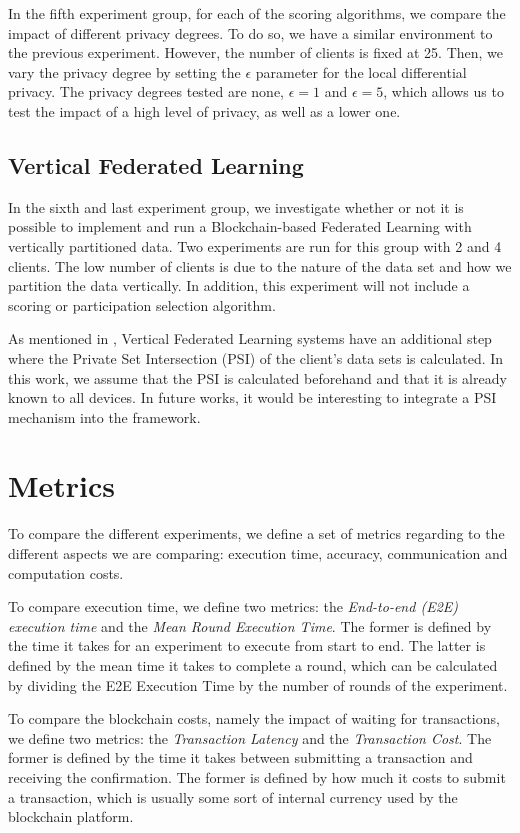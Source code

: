 In the fifth experiment group, for each of the scoring algorithms, we compare the impact of different privacy degrees. To do so, we have a similar environment to the previous experiment. However, the number of clients is fixed at 25. Then, we vary the privacy degree by setting the $\epsilon$ parameter for the local differential privacy. The privacy degrees tested are none, $\epsilon = 1$ and $\epsilon = 5$, which allows us to test the impact of a high level of privacy, as well as a lower one.

\subsection{Vertical Federated Learning}

In the sixth and last experiment group, we investigate whether or not it is possible to implement and run a Blockchain-based Federated Learning with vertically partitioned data. Two experiments are run for this group with 2 and 4 clients. The low number of clients is due to the nature of the data set and how we partition the data vertically. In addition, this experiment will not include a scoring or participation selection algorithm.

As mentioned in , Vertical Federated Learning systems have an additional step where the Private Set Intersection (PSI) of the client's data sets is calculated. In this work, we assume that the PSI is calculated beforehand and that it is already known to all devices. In future works, it would be interesting to integrate a PSI mechanism into the framework.

\section{Metrics}\label{meth:metrics}

To compare the different experiments, we define a set of metrics regarding to the different aspects we are comparing: execution time, accuracy, communication and computation costs.

To compare execution time, we define two metrics: the \textit{End-to-end (E2E) execution time} and the \textit{Mean Round Execution Time}. The former is defined by the time it takes for an experiment to execute from start to end. The latter is defined by the mean time it takes to complete a round, which can be calculated by dividing the E2E Execution Time by the number of rounds of the experiment.

To compare the blockchain costs, namely the impact of waiting for transactions, we define two metrics: the \textit{Transaction Latency} and the \textit{Transaction Cost}. The former is defined by the time it takes between submitting a transaction and receiving the confirmation. The former is defined by how much it costs to submit a transaction, which is usually some sort of internal currency used by the blockchain platform.

